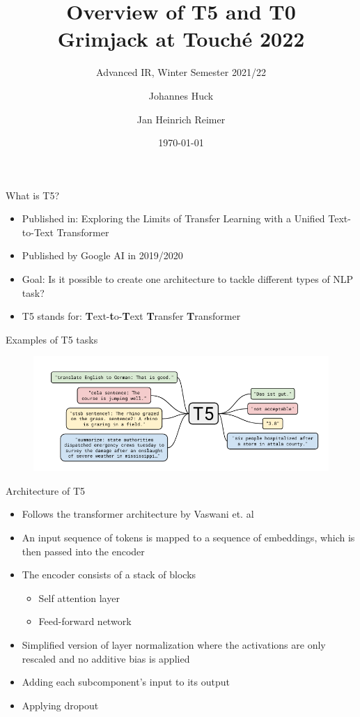 \documentclass[english]{mlutalk}
\title{Overview of T5 and T0\\Grimjack at Touché 2022}
\subtitle{Advanced IR, Winter Semester 2021/22}
\author{Johannes Huck \and Jan Heinrich Reimer}
\institute{Martin Luther University Halle-Wittenberg}
\date{\today}
\begin{document}
\titleframe

\begin{frame}{What is T5?~\cite{RaffelSRLNMZLL2020}}
  \begin{itemize}
    \item Published in: Exploring the Limits of Transfer Learning with a Unified
    Text-to-Text Transformer
    \item Published by Google AI in 2019/2020
    \item Goal: Is it possible to create one architecture to tackle different types of NLP task? 
    \item T5 stands for: \textbf{T}ext-\textbf{t}o-\textbf{T}ext \textbf{T}ransfer \textbf{T}ransformer
  \end{itemize}
\end{frame}


\begin{frame}{Examples of T5 tasks}
  \begin{figure}
      \centering
      \includegraphics[width=\linewidth]{figures/t5-examples.png}
  \end{figure}
\end{frame}

\begin{frame}{Architecture of T5}
    \begin{itemize}
      \item Follows the transformer architecture by Vaswani et. al~\cite{VaswaniSPUJGKP2017}
      \item An input sequence of tokens is mapped to
      a sequence of embeddings, which is then passed into the encoder
      \item The encoder consists of a stack of blocks
      \begin{itemize}
        \item Self attention layer
        \item Feed-forward network
      \end{itemize}
      \item Simplified version of layer normalization where
      the activations are only rescaled and no additive bias is applied
      \item Adding each subcomponent’s input to its output
      \item Applying dropout
    \end{itemize}
\end{frame}
\end{document}
